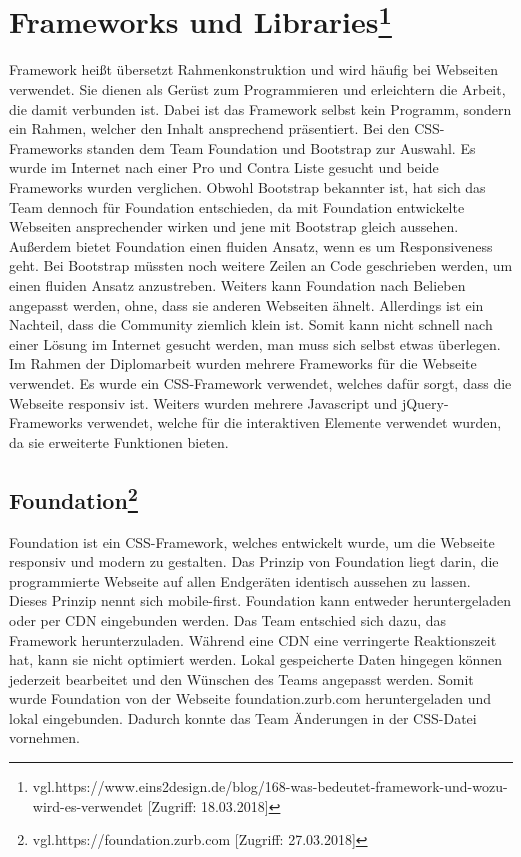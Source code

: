 \section[Frameworks und Libraries]{Frameworks und Libraries\protect\footnote{\label{foot:2}vgl.https://www.eins2design.de/blog/168-was-bedeutet-framework-und-wozu-wird-es-verwendet [Zugriff: 18.03.2018]}} 
Framework heißt übersetzt Rahmenkonstruktion und wird häufig bei Webseiten verwendet. Sie dienen als Gerüst zum Programmieren und erleichtern die Arbeit, die damit verbunden ist. Dabei ist das Framework selbst kein Programm, sondern ein Rahmen, welcher den Inhalt ansprechend präsentiert. Bei den CSS-Frameworks standen dem Team Foundation und Bootstrap zur Auswahl. Es wurde im Internet nach einer Pro und Contra Liste gesucht und beide Frameworks wurden verglichen. Obwohl Bootstrap bekannter ist, hat sich das Team dennoch für Foundation entschieden, da mit Foundation entwickelte Webseiten ansprechender wirken und jene mit Bootstrap gleich aussehen. Außerdem bietet Foundation einen fluiden Ansatz, wenn es um Responsiveness geht. Bei Bootstrap müssten noch weitere Zeilen an Code geschrieben werden, um einen fluiden Ansatz anzustreben.   Weiters kann Foundation nach Belieben angepasst werden, ohne, dass sie anderen Webseiten ähnelt. Allerdings ist ein Nachteil, dass die Community ziemlich klein ist. Somit kann nicht schnell nach einer Lösung im Internet gesucht werden, man muss sich selbst etwas überlegen. Im Rahmen der Diplomarbeit wurden mehrere Frameworks für die Webseite verwendet. Es wurde ein CSS-Framework verwendet, welches dafür sorgt, dass die Webseite responsiv ist. Weiters wurden mehrere Javascript und jQuery-Frameworks verwendet, welche für die interaktiven Elemente verwendet wurden, da sie erweiterte Funktionen bieten. 

\subsection[Foundation]{Foundation\protect\footnote{\label{foot:2}vgl.https://foundation.zurb.com [Zugriff: 27.03.2018]}}
Foundation ist ein CSS-Framework, welches entwickelt wurde, um die Webseite responsiv und modern zu gestalten. Das Prinzip von Foundation liegt darin, die programmierte Webseite auf allen Endgeräten identisch aussehen zu lassen. Dieses Prinzip nennt sich mobile-first. Foundation kann entweder heruntergeladen oder per CDN eingebunden werden. Das Team entschied sich dazu, das Framework herunterzuladen. Während eine CDN eine verringerte Reaktionszeit hat, kann sie nicht optimiert werden. Lokal gespeicherte Daten hingegen können jederzeit bearbeitet und den Wünschen des Teams angepasst werden. Somit wurde Foundation von der Webseite foundation.zurb.com heruntergeladen und lokal eingebunden. Dadurch konnte das Team Änderungen in der CSS-Datei vornehmen. 
